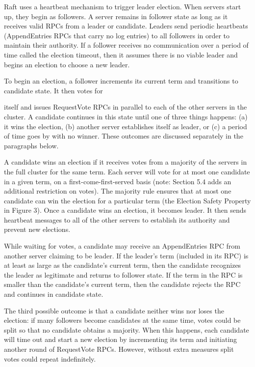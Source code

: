 \documentclass[
]{article}
\begin{document}
Raft uses a heartbeat mechanism to trigger leader election. When servers
start up, they begin as followers. A server remains in follower state as
long as it receives valid RPCs from a leader or candidate. Leaders send
periodic heartbeats (AppendEntries RPCs that carry no log entries) to
all followers in order to maintain their authority. If a follower
receives no communication over a period of time called the election
timeout, then it assumes there is no viable leader and begins an
election to choose a new leader.

To begin an election, a follower increments its current term and
transitions to candidate state. It then votes for

itself and issues RequestVote RPCs in parallel to each of the other
servers in the cluster. A candidate continues in this state until one of
three things happens: (a) it wins the election, (b) another server
establishes itself as leader, or (c) a period of time goes by with no
winner. These outcomes are discussed separately in the paragraphs below.

A candidate wins an election if it receives votes from a majority of the
servers in the full cluster for the same term. Each server will vote for
at most one candidate in a given term, on a first-come-first-served
basis (note: Section 5.4 adds an additional restriction on votes). The
majority rule ensures that at most one candidate can win the election
for a particular term (the Election Safety Property in Figure 3). Once a
candidate wins an election, it becomes leader. It then sends heartbeat
messages to all of the other servers to establish its authority and
prevent new elections.

While waiting for votes, a candidate may receive an AppendEntries RPC
from another server claiming to be leader. If the leader's term
(included in its RPC) is at least as large as the candidate's current
term, then the candidate recognizes the leader as legitimate and returns
to follower state. If the term in the RPC is smaller than the
candidate's current term, then the candidate rejects the RPC and
continues in candidate state.

The third possible outcome is that a candidate neither wins nor loses
the election: if many followers become candidates at the same time,
votes could be split so that no candidate obtains a majority. When this
happens, each candidate will time out and start a new election by
incrementing its term and initiating another round of RequestVote RPCs.
However, without extra measures split votes could repeat indefinitely.
\end{document}
